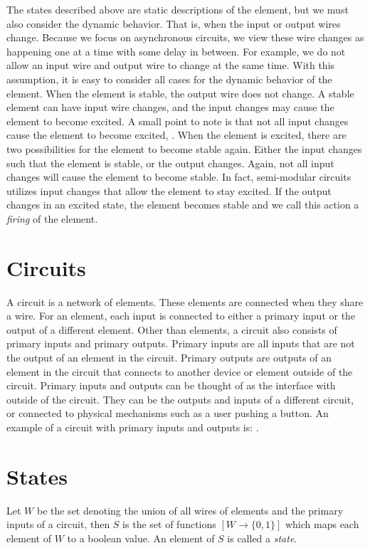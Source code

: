 \documentclass[12pt]{report}
\begin{document}
The states described above are static descriptions of the element, but we must also consider the dynamic behavior.  
That is, when the input or output wires change.  Because we focus on asynchronous circuits, we view these wire changes as happening one at a time with some delay in between.  For example, we do not allow an input wire and output wire to change at the same time.  With this assumption, it is easy to consider all cases for the dynamic behavior of the element.  When the element is stable, the output wire does not change.  A stable element can have input wire changes, and the input changes may cause the element to become excited.  A small point to note is that not all input changes cause the element to become excited, .
When the element is excited, there are two possibilities for the element to become stable again.  Either the input changes such that the element is stable, or the output changes.  Again, not all input changes will cause the element to become stable.  In fact, semi-modular circuits utilizes input changes that allow the element to stay excited.  If the output changes in an excited state, the element becomes stable and we call this action a {\em firing} of the element.

\section{Circuits}
A circuit is a network of elements.  These elements are connected when they share a wire.  For an element, each input is connected to either a primary input or the output of a different element.  Other than elements, a circuit also consists of primary inputs and primary outputs.  Primary inputs are all inputs that are not the output of an element in the circuit.  Primary outputs are outputs of an element in the circuit that connects to another device or element outside of the circuit.  Primary inputs and outputs can be thought of as the interface with outside of the circuit.  They can be the outputs and inputs of a different circuit, or connected to physical mechanisms such as a user pushing a button.   An example of a circuit with primary inputs and outputs is:  .
    
\section{States}
Let $W$ be the set denoting the union of all wires of elements and the primary inputs of a circuit, then $S$ is the set of functions $[W\to \{0,1\}]$ which maps each element of $W$ to a boolean value.  An element of $S$ is called a {\em state}.  
\end{document}
